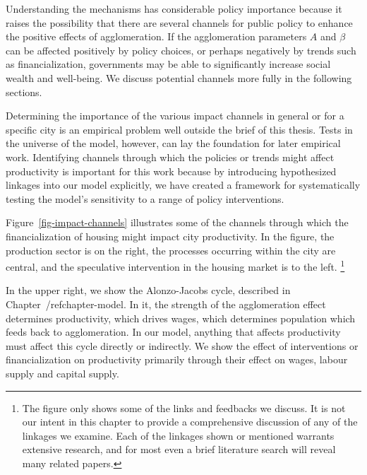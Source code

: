 Understanding the mechanisms has considerable policy importance because it raises the possibility that there are several channels for public policy to enhance the positive effects of agglomeration. If the agglomeration parameters $A$ and  $\beta$ can be affected positively by policy choices, or perhaps negatively by trends such as financialization,  governments may be able to significantly increase social wealth and well-being. We discuss potential channels more fully in the following sections. 

Determining the importance of the various impact channels in general or for a specific city is an empirical problem well outside the brief of this thesis. Tests in the universe of the model, however, can lay the foundation for later empirical work. Identifying channels through which the policies or trends might affect productivity is important for this work because by introducing hypothesized linkages into our model explicitly, we have created a framework for systematically testing the model's sensitivity to a range of policy interventions. 

Figure~\ref{fig-impact-channels} illustrates some of the channels through which the financialization of housing might impact city productivity. 
In the figure, the production sector is on the right, the processes occurring within the city are central, and the speculative intervention in the housing market is to the left.  \footnote{The figure only shows some of the links and feedbacks we discuss. It is not our intent in this chapter to provide  a comprehensive discussion of any of the linkages we examine. Each of the linkages shown or mentioned warrants extensive research, and for most even a brief literature search will reveal many related papers.} 


In the upper right, we show the \gls{Alonzo-Jacobs cycle}, described in Chapter~/ref{chapter-model}. In it, the strength of the agglomeration effect determines productivity, which drives wages, which determines population which feeds back to agglomeration. In our model, anything that affects productivity must affect this cycle directly or indirectly.  We show the effect of interventions or financialization on productivity primarily through their effect on wages, labour supply and capital supply. %


